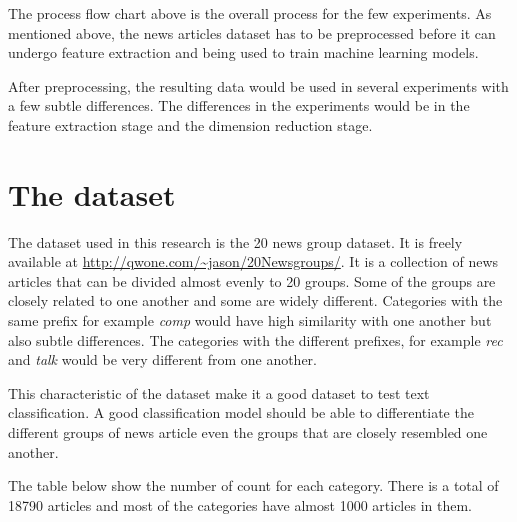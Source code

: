 The process flow chart above is the overall process for the few experiments. As mentioned above, the news articles dataset has to be preprocessed before it can undergo feature extraction and being used to train machine learning models.

After preprocessing, the resulting data would be used in several experiments with a few subtle differences.
The differences in the experiments would be in the feature extraction stage and the dimension reduction stage. 

\clearpage
\section{The dataset}
\graphicspath{{./images/}}

The dataset used in this research is the 20 news group dataset. It is freely available at \url{http://qwone.com/~jason/20Newsgroups/}. It is a collection of news articles that can be divided almost evenly to 20 groups. Some of the groups are closely related to one another and some are widely different. Categories with the same prefix for example \textit{comp} would have high similarity with one another but also subtle differences. The categories with the different prefixes, for example \textit{rec} and \textit{talk} would be very different from one another.

This characteristic of the dataset make it a good dataset to test text classification. A good classification model should be able to differentiate the different groups of news article even the groups that are closely resembled one another.

The table below show the number of count for each category. There is a total of 18790 articles and most of the categories have almost 1000 articles in them. 

